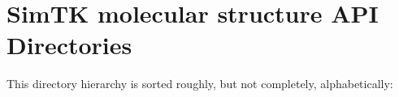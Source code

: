 \section{Sim\-TK molecular structure API Directories}
This directory hierarchy is sorted roughly, but not completely, alphabetically:\begin{CompactList}
\item {}
\begin{CompactList}
\item {}
\begin{CompactList}
\item {}
\begin{CompactList}
\item {}
\begin{CompactList}
\item {}
\begin{CompactList}
\item {}
\item {}
\item {}
\end{CompactList}
\end{CompactList}
\end{CompactList}
\end{CompactList}
\end{CompactList}
\end{CompactList}

